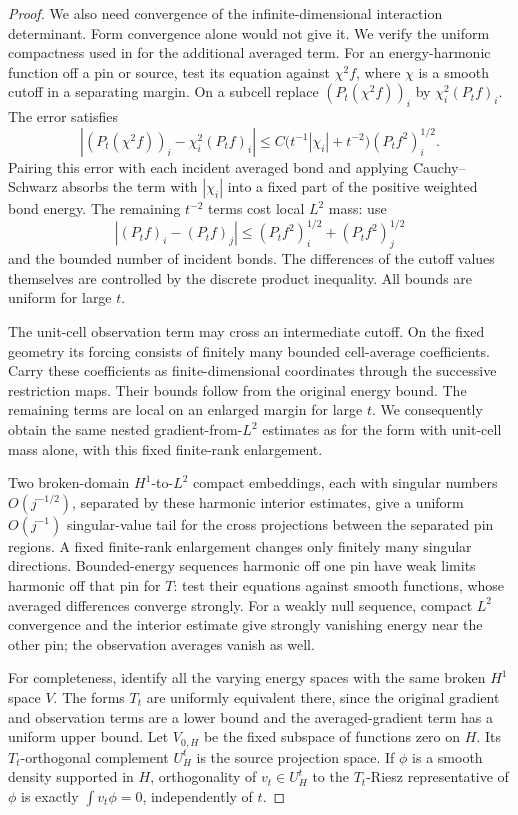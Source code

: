 \begin{proof}
We also need convergence of the infinite-dimensional interaction
determinant.  Form convergence alone would not give it.  We verify
the uniform compactness used in 
for the additional averaged term.
For an energy-harmonic function off a pin or source, test its
equation against \(\chi^2f\), where \(\chi\) is a smooth cutoff
in a separating margin.  On a subcell replace
\((P_t(\chi^2f))_i\) by \(\chi_i^2(P_tf)_i\).  The error satisfies
\begin{equation}\label{eq:op-cutoff-error}
 \left|(P_t(\chi^2f))_i-\chi_i^2(P_tf)_i\right|
 \leq C\bigl(t^{-1}|\chi_i|+t^{-2}\bigr)
                         (P_tf^2)_i^{1/2}.
\end{equation}
Pairing this error with each incident averaged bond and applying
Cauchy--Schwarz absorbs the term with \(|\chi_i|\) into a fixed
part of the positive weighted bond energy.  The remaining
\(t^{-2}\) terms cost local \(L^2\) mass: use
\[
 |(P_tf)_i-(P_tf)_j|
       \leq(P_tf^2)_i^{1/2}+(P_tf^2)_j^{1/2}
\]
and the bounded number of incident bonds.  The differences of
the cutoff values themselves are controlled by the discrete
product inequality.  All bounds are uniform for large \(t\).

The unit-cell observation term may cross an intermediate cutoff.
On the fixed geometry its forcing consists of finitely many
bounded cell-average coefficients.  Carry these coefficients
as finite-dimensional coordinates through the successive
restriction maps.  Their bounds follow from the original energy
bound.  The remaining terms are local on an enlarged margin for
large \(t\).  We consequently obtain the same nested
gradient-from-\(L^2\) estimates as for the form with unit-cell
mass alone, with this fixed finite-rank enlargement.

Two broken-domain \(H^1\)-to-\(L^2\) compact embeddings, each
with singular numbers \(O(j^{-1/2})\), separated by these
harmonic interior estimates, give a uniform \(O(j^{-1})\)
singular-value tail for the cross projections between the
separated pin regions.  A fixed finite-rank enlargement changes
only finitely many singular directions.  Bounded-energy
sequences harmonic off one pin have weak limits harmonic off
that pin for \(T\): test their equations against smooth
functions, whose averaged differences converge strongly.
For a weakly null sequence, compact \(L^2\) convergence and the
interior estimate give strongly vanishing energy near the
other pin; the observation averages vanish as well.

For completeness, identify all the varying energy spaces with
the same broken \(H^1\) space \(V\).  The forms \(T_t\) are
uniformly equivalent there, since the original gradient and
observation terms are a lower bound and the averaged-gradient
term has a uniform upper bound.  Let \(V_{0,H}\) be the fixed
subspace of functions zero on \(H\).  Its \(T_t\)-orthogonal
complement \(U_H^t\) is the source projection space.  If
\(\phi\) is a smooth density supported in \(H\), orthogonality
of \(v_t\in U_H^t\) to the \(T_t\)-Riesz representative of
\(\phi\) is exactly \(\int v_t\phi=0\), independently of \(t\).


\end{proof}

